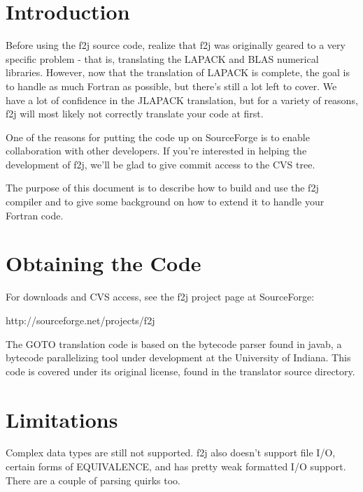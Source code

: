 \documentclass[11pt]{article}
\begin{document}


%

\newpage
{}
\setcounter{page}{1}

\section{Introduction}

Before using the f2j source code, realize that f2j was originally geared
to a very specific problem - that is, translating the LAPACK and BLAS numerical
libraries.  However, now that the translation of LAPACK is complete, the goal is
to handle as much Fortran as possible, but there's still a lot left to cover.
We have a lot of confidence in the JLAPACK translation, but for a variety of
reasons, f2j will most likely not correctly translate your code at first.

One of the reasons for putting the code up on SourceForge is to enable
collaboration with other developers.  If you're interested in helping the
development of f2j, we'll be glad to give commit access to the CVS tree.

The purpose of this document is to describe how to build and use the f2j compiler and
to give some background on how to extend it to handle your Fortran code. 

\section{Obtaining the Code}

For downloads and CVS access, see the f2j project page at SourceForge:

  http://sourceforge.net/projects/f2j

The GOTO translation code is based on the bytecode parser found in javab, a
bytecode parallelizing tool under development at the University of Indiana.
This code is covered under its original license, found in the translator source
directory.

\section{Limitations}

Complex data types are still not supported.  f2j also doesn't support file
I/O, certain forms of EQUIVALENCE, and has pretty weak formatted I/O
support.  There are a couple of parsing quirks too.
\end{document}
